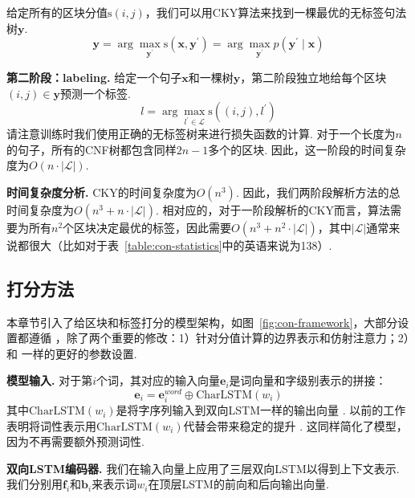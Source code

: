 给定所有的区块分值$\mathrm{s}(i,j)$，我们可以用CKY算法来找到一棵最优的无标签句法树$\boldsymbol{y}$.
\begin{equation} \label{eq:tree-argmax}
	\boldsymbol{y} = \arg\max_{\boldsymbol{y}^{\prime}} \mathrm{s}(\boldsymbol{x}, \boldsymbol{y}^{\prime}) = \arg\max_{\boldsymbol{y}^{\prime}} p(\boldsymbol{y}^{\prime} \mid \boldsymbol{x})
\end{equation}

\noindent\textbf{第二阶段：labeling.}
给定一个句子$\boldsymbol{x}$和一棵树$\boldsymbol{y}$，第二阶段独立地给每个区块$(i,j) \in \boldsymbol{y}$预测一个标签.
\begin{equation} \label{eq:label-argmax}
	l = \arg\max_{l^{\prime} \in \mathcal{L}} \mathrm{s}((i,j),l^{\prime})
\end{equation}
请注意训练时我们使用正确的无标签树来进行损失函数的计算.
对于一个长度为$n$的句子，所有的CNF树都包含同样$2n-1$多个的区块.
因此，这一阶段的时间复杂度为$O(n\cdot|\mathcal{L}|)$.

\noindent\textbf{时间复杂度分析.}
CKY的时间复杂度为$O(n^3)$.
因此，我们两阶段解析方法的总时间复杂度为$O(n^3+n\cdot|\mathcal{L}|)$.
相对应的，对于一阶段解析的CKY而言，算法需要为所有$n^2$个区块决定最优的标签，因此需要$O(n^3+n^2\cdot|\mathcal{L}|)$，其中$|\mathcal{L}|$通常来说都很大（比如对于表~\ref{table:con-statistics}中的英语来说为138）.

\subsection{打分方法}

本章节引入了给区块和标签打分的模型架构，如图~\ref{fig:con-framework}，大部分设置都遵循 \citet{stern-etal-2017-minimal}，除了两个重要的修改：1）针对分值计算的边界表示和仿射注意力；2）和 \citet{dozat-etal-2017-biaffine}一样的更好的参数设置.

\noindent\textbf{模型输入.}
对于第$i$个词，其对应的输入向量$\mathbf{e}_i$是词向量和字级别表示的拼接：
\begin{equation} \label{eq:token-representation}
	\mathbf{e}_i = \mathbf{e}^{word}_i \oplus \mathrm{CharLSTM}(w_i)
\end{equation}
其中$\mathrm{CharLSTM}(w_i)$是将字序列输入到双向LSTM一样的输出向量 \citep{lample-etal-2016-neural}.
以前的工作表明将词性表示用$\mathrm{CharLSTM}(w_i)$代替会带来稳定的提升 \citep{kitaev-klein-2018-constituency}.
这同样简化了模型，因为不再需要额外预测词性.

\noindent\textbf{双向LSTM编码器.}
我们在输入向量上应用了三层双向LSTM以得到上下文表示.
我们分别用$\mathbf{f}_i$和$\mathbf{b}_i$来表示词$w_i$在顶层LSTM的前向和后向输出向量.

